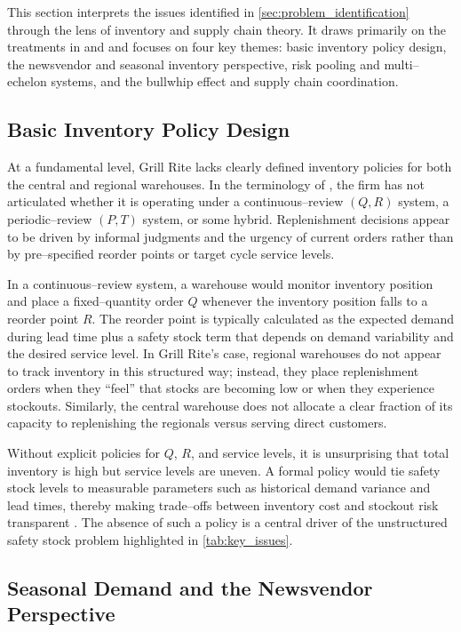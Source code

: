 \documentclass[12pt,a4paper]{article}
\begin{document}
This section interprets the issues identified in \cref{sec:problem_identification} through the lens of inventory and supply chain theory. It draws primarily on the treatments in \citet{stevenson2017operations} and \citep{cachon2018matching} and focuses on four key themes: basic inventory policy design, the newsvendor and seasonal inventory perspective, risk pooling and multi–echelon systems, and the bullwhip effect and supply chain coordination.

\subsection{Basic Inventory Policy Design}

At a fundamental level, Grill Rite lacks clearly defined inventory policies for both the central and regional warehouses. In the terminology of \citet{stevenson2017operations}, the firm has not articulated whether it is operating under a continuous–review $(Q, R)$ system, a periodic–review $(P, T)$ system, or some hybrid. Replenishment decisions appear to be driven by informal judgments and the urgency of current orders rather than by pre–specified reorder points or target cycle service levels.

In a continuous–review system, a warehouse would monitor inventory position and place a fixed–quantity order $Q$ whenever the inventory position falls to a reorder point $R$. The reorder point is typically calculated as the expected demand during lead time plus a safety stock term that depends on demand variability and the desired service level. In Grill Rite's case, regional warehouses do not appear to track inventory in this structured way; instead, they place replenishment orders when they ``feel'' that stocks are becoming low or when they experience stockouts. Similarly, the central warehouse does not allocate a clear fraction of its capacity to replenishing the regionals versus serving direct customers.

Without explicit policies for $Q$, $R$, and service levels, it is unsurprising that total inventory is high but service levels are uneven. A formal policy would tie safety stock levels to measurable parameters such as historical demand variance and lead times, thereby making trade–offs between inventory cost and stockout risk transparent \citep{stevenson2017operations}. The absence of such a policy is a central driver of the unstructured safety stock problem highlighted in \cref{tab:key_issues}.

\subsection{Seasonal Demand and the Newsvendor Perspective}
\end{document}
